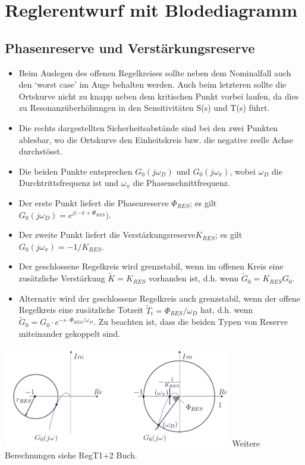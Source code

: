 \section{Reglerentwurf mit Blodediagramm}

\subsection{Phasenreserve und Verstärkungsreserve}
\begin{multicols}{2}
\begin{itemize}
\item Beim Auslegen des offenen Regelkreises sollte neben dem Nominalfall
auch den ‘worst case’ im Auge behalten werden. Auch beim letzteren sollte die
Ortskurve nicht zu knapp neben dem kritischen Punkt vorbei laufen, da dies zu
Resonanzüberhöhungen in den Sensitivitäten S(s) und T(s) führt.
\item Die rechts dargestellten Sicherheitsabstände sind bei den zwei Punkten ablesbar,
wo die Ortskurve den Einheitskreis bzw. die negative reelle Achse durchstösst.
\item Die beiden Punkte entsprechen $G_0(j\omega_D)$ und $G_0(j\omega_{\pi})$, wobei $\omega_D$ die Durchtrittsfrequenz
ist und $\omega_{\pi}$ die Phasenschnittfrequenz.
\item Der erste Punkt liefert die Phasenreserve $\Phi_{RES}$; es gilt $G_0(j\omega_D) = e^{j(-\pi+\Phi_{RES}})$. 
\item Der zweite Punkt liefert die Verstärkungsreserve$K_{RES}$; es gilt $G_0(j\omega_{\pi}) = -1/K_{RES}$. 
\item Der geschlossene Regelkreis wird grenzstabil, wenn im offenen Kreis eine zusätzliche Verstärkung $\widetilde{K} = K_{RES}$ vorhanden ist, d.h. wenn $\widetilde{G}_0 = K_{RES}G_0$.
\item Alternativ wird der geschlossene Regelkreis auch grenzstabil, wenn der offene Regelkreis eine zusätzliche Totzeit $\widetilde{T}_t = \Phi_{RES}/\omega_D$ hat,
d.h. wenn $\widetilde{G}_0 = G_0\cdot e^{-s\cdot\Phi_{RES}/\omega_D}$. Zu beachten ist, dass die beiden Typen von Reserve
miteinander gekoppelt sind.
\end{itemize}
		\includegraphics[width=10cm]{./images/PhasenVerstaerkungReserve.png}
Weitere Berechnungen siehe RegT1+2 Buch.
\end{multicols}
